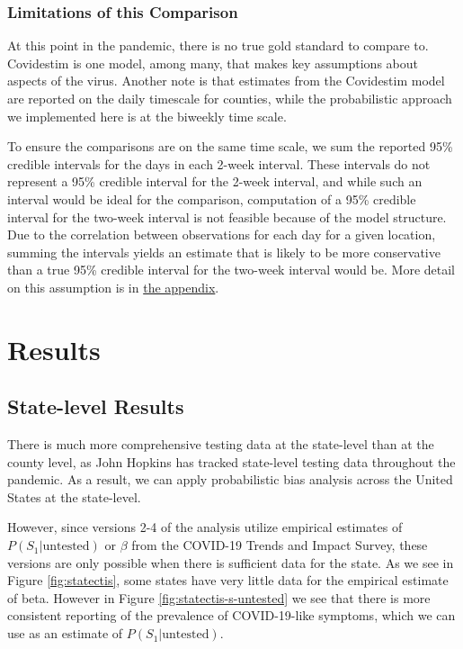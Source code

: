 \documentclass[12pt,twoside]{smiththesis}
\begin{document}
\hypertarget{lims}{%
\subsection{Limitations of this Comparison}\label{lims}}

At this point in the pandemic, there is no true gold standard to compare to. Covidestim is one model, among many, that makes key assumptions about aspects of the virus. Another note is that estimates from the Covidestim model are reported on the daily timescale for counties, while the probabilistic approach we implemented here is at the biweekly time scale.

To ensure the comparisons are on the same time scale, we sum the reported 95\% credible intervals for the days in each 2-week interval. These intervals do not represent a 95\% credible interval for the 2-week interval, and while such an interval would be ideal for the comparison, computation of a 95\% credible interval for the two-week interval is not feasible because of the model structure. Due to the correlation between observations for each day for a given location, summing the intervals yields an estimate that is likely to be more conservative than a true 95\% credible interval for the two-week interval would be. More detail on this assumption is in \protect\hyperlink{conservativeintervals}{the appendix}.

\hypertarget{res}{%
\chapter{Results}\label{res}}

\hypertarget{state-level-results}{%
\section{State-level Results}\label{state-level-results}}

There is much more comprehensive testing data at the state-level than at the county level, as John Hopkins has tracked state-level testing data throughout the pandemic.
As a result, we can apply probabilistic bias analysis across the United States at the state-level.

However, since versions 2-4 of the analysis utilize empirical estimates of \(P(S_1|\text{untested})\) or \(\beta\) from the COVID-19 Trends and Impact Survey, these versions are only possible when there is sufficient data for the state. As we see in Figure \ref{fig:statectis}, some states have very little data for the empirical estimate of beta. However in Figure \ref{fig:statectis-s-untested} we see that there is more consistent reporting of the prevalence of COVID-19-like symptoms, which we can use as an estimate of \(P(S_1|\text{untested})\).
\end{document}
